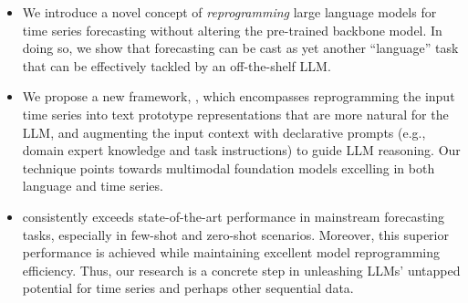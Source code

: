 \vspace{-2mm}
\begin{itemize}
    \item We introduce a novel concept of \emph{reprogramming} large language models for time series forecasting without altering the pre-trained backbone model. In doing so, we show that forecasting can be cast as yet another ``language'' task that can be effectively tackled by an off-the-shelf LLM.
 
    \item We propose a new framework, \method, which encompasses reprogramming the input time series into text prototype representations that are more natural for the LLM, and augmenting the input context with declarative prompts (e.g., domain expert knowledge and task instructions) to guide LLM reasoning. Our technique points towards multimodal foundation models excelling in both language and time series.
 
    \item \method consistently exceeds state-of-the-art performance in mainstream forecasting tasks, especially in few-shot and zero-shot scenarios. Moreover, this superior performance is achieved while maintaining excellent model reprogramming efficiency. Thus, our research is a concrete step in unleashing LLMs' untapped potential for time series and perhaps other sequential data.
\end{itemize}
